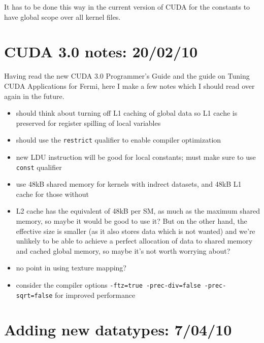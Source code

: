 \documentclass[12pt]{article}
\begin{document}
It has to be done this way in the current version of CUDA for the 
constants to have global scope over all kernel files.

\newpage

\section{CUDA 3.0 notes: 20/02/10}

Having read the new CUDA 3.0 Programmer's Guide and the guide on
Tuning CUDA Applications for Fermi, here I make a few notes which 
I should read over again in the future.

\begin{itemize}
\item
should think about turning off L1 caching of global data so L1 cache is 
preserved for register spilling of local variables

\item
should use the {\tt restrict} qualifier to enable compiler optimization

\item
new LDU instruction will be good for local constants; must make sure to use
{\tt const} qualifier

\item
use 48kB shared memory for kernels with indrect datasets, and
48kB L1 cache for those without

\item
L2 cache has the equivalent of 48kB per SM, as much as the maximum 
shared memory, so maybe it would be good to use it?  But on the other 
hand, the effective size is smaller (as it also stores data which is 
not wanted) and we're unlikely to be able to achieve a perfect 
allocation of data to shared memory and cached global memory, so 
maybe it's not worth worrying about?

\item
no point in using texture mapping?

\item
consider the compiler options 
{\tt -ftz=true -prec-div=false -prec-sqrt=false} 
for improved performance

\end{itemize}


\section{Adding new datatypes: 7/04/10}
\end{document}
